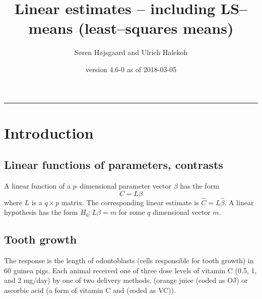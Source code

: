 \documentclass[10pt]{article}\usepackage[]{graphicx}\usepackage[]{color}
\title{Linear estimates -- including LS--means (least--squares means)}
\author{S{\o}ren H{\o}jsgaard and Ulrich Halekoh}
\date{\pkg{doBy} version 4.6-0 as of 2018-03-05}
\begin{document}




\maketitle
\hrule
\tableofcontents

\parindent0pt
\parskip5pt








\section{Introduction}
\label{sec:introduction}

\subsection{Linear functions of parameters, contrasts}
\label{sec:line-funct-param}

A linear function of a $p$--dimensional parameter vector $\beta$ has
the form
\begin{displaymath}
  C=L\beta
\end{displaymath}
where $L$ is a $q\times p$ matrix. The corresponding
linear estimate is $\hat C = L \hat \beta$.
A linear hypothesis has the form
$H_0: L\beta=m$ for some $q$ dimensional vector $m$.

\subsection{Tooth growth}
\label{sec:tooth-growth}

The response is the length of odontoblasts (cells responsible for
tooth growth) in 60 guinea pigs.  Each animal received one of
three dose levels of vitamin C (0.5, 1, and 2 mg/day) by one of
two delivery methods, (orange juice (coded as OJ) or ascorbic acid 
(a form of vitamin C and (coded as VC)).
\end{document}
